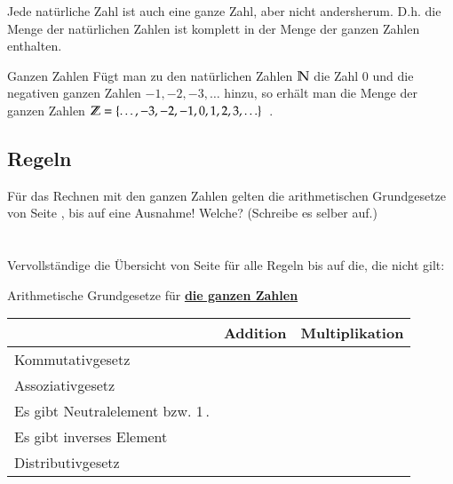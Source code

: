 Jede natürliche Zahl ist auch eine ganze Zahl, aber nicht andersherum.
D.h. die Menge der natürlichen Zahlen ist komplett in der Menge der ganzen Zahlen enthalten.

\vspace{1cm}
\begin{defn}{Ganzen Zahlen}
	Fügt man zu den natürlichen Zahlen $\mathbb{N}$ die Zahl 0 und die negativen ganzen Zahlen $-1, -2, -3,\ldots$ hinzu,
	so erhält man die Menge der ganzen Zahlen $\mathbb{Z} = \{ \ldots, -3, -2, -1, 0, 1, 2, 3, \ldots \}$\, .
\end{defn}


\subsection{Regeln}
Für das Rechnen mit den ganzen Zahlen gelten die arithmetischen Grundgesetze von Seite \pageref{law:arithmetic}, bis auf eine Ausnahme!
Welche? (Schreibe es selber auf.)\\
\\~\\
Vervollständige die Übersicht von Seite \pageref{law:arithmetic} für alle Regeln bis auf die, die nicht gilt:
\begin{law}{Arithmetische Grundgesetze für \underline{\bfseries die ganzen Zahlen}}
    \bgroup
    \def\arraystretch{2.5}
	\begin{tabularx}{\linewidth}{|X|p{3.7cm}|p{3.7cm}|}
			\hline
			 & Addition & Multiplikation \\
			\hline
			Kommutativgesetz &  &  \\\hline
			Assoziativgesetz &  &  \\\hline
			Es gibt Neutralelement\newline 0 bzw. 1\,. &  &  \\\hline
			Es gibt inverses Element\newline~ & & \\
			\hline
			Distributivgesetz & \multicolumn{2}{c|}{} \\
			\hline
    \end{tabularx}
    \egroup
\end{law}

